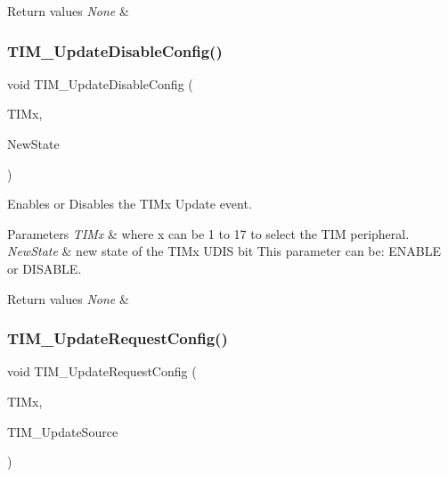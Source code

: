\begin{DoxyRetVals}{Return values}
{\em None} & \\
\hline
\end{DoxyRetVals}
\mbox{\label{group___t_i_m___private___functions_gace2384dd33e849a054f61b8e1fc7e7c3}} 
\subsubsection{\texorpdfstring{TIM\_UpdateDisableConfig()}{TIM\_UpdateDisableConfig()}}
{\footnotesize\ttfamily void T\+I\+M\+\_\+\+Update\+Disable\+Config (\begin{DoxyParamCaption}\item[{\mbox{\hyperlink{struct_t_i_m___type_def}{T\+I\+M\+\_\+\+Type\+Def}} $\ast$}]{T\+I\+Mx,  }\item[{\mbox{\hyperlink{group___exported__types_gac9a7e9a35d2513ec15c3b537aaa4fba1}{Functional\+State}}}]{New\+State }\end{DoxyParamCaption})}



Enables or Disables the T\+I\+Mx Update event. 


\begin{DoxyParams}{Parameters}
{\em T\+I\+Mx} & where x can be 1 to 17 to select the T\+IM peripheral. \\
\hline
{\em New\+State} & new state of the T\+I\+Mx U\+D\+IS bit This parameter can be\+: E\+N\+A\+B\+LE or D\+I\+S\+A\+B\+LE. \\
\hline
\end{DoxyParams}

\begin{DoxyRetVals}{Return values}
{\em None} & \\
\hline
\end{DoxyRetVals}
\mbox{\label{group___t_i_m___private___functions_ga1d7a8f952e209de142499e67a653fc1f}} 
\subsubsection{\texorpdfstring{TIM\_UpdateRequestConfig()}{TIM\_UpdateRequestConfig()}}
{\footnotesize\ttfamily void T\+I\+M\+\_\+\+Update\+Request\+Config (\begin{DoxyParamCaption}\item[{\mbox{\hyperlink{struct_t_i_m___type_def}{T\+I\+M\+\_\+\+Type\+Def}} $\ast$}]{T\+I\+Mx,  }\item[{uint16\+\_\+t}]{T\+I\+M\+\_\+\+Update\+Source }\end{DoxyParamCaption})}



